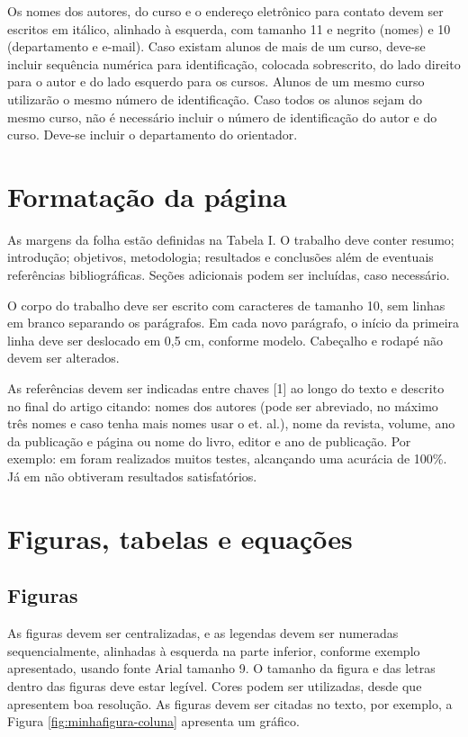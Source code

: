 \documentclass[a4paper,10pt, twocolumn]{article}
\begin{document}
 Os nomes dos autores, do curso e o endereço eletrônico para contato devem ser escritos em itálico, alinhado à esquerda, com tamanho 11 e negrito (nomes) e 10 (departamento e e-mail). Caso existam alunos de mais de um curso, deve-se incluir sequência numérica para identificação, colocada sobrescrito, do lado direito para o autor e do lado esquerdo para os cursos. Alunos de um mesmo curso utilizarão o mesmo número de identificação. Caso todos os alunos sejam do mesmo curso, não é necessário incluir o número de identificação do autor e do curso. Deve-se incluir o departamento do orientador.

\section{Formatação da página}
As margens da folha estão definidas na Tabela I. O trabalho deve conter resumo; introdução; objetivos, metodologia; resultados e conclusões além de eventuais referências bibliográficas. Seções adicionais podem ser incluídas, caso necessário. 

O corpo do trabalho deve ser escrito com caracteres de tamanho 10, sem linhas em branco separando os parágrafos. Em cada novo parágrafo, o início da primeira linha deve ser deslocado em 0,5 cm, conforme modelo. Cabeçalho e rodapé não devem ser alterados.

As referências devem ser indicadas entre chaves [1] ao longo do texto e descrito no final do artigo citando: nomes dos autores (pode ser abreviado, no máximo três nomes e caso tenha mais nomes usar o et. al.), nome da revista, volume, ano da publicação e página ou nome do livro, editor e ano de publicação. 
Por exemplo: em \cite{10.1145/3716895.3716981} foram realizados muitos testes, alcançando uma acurácia de 100\%. Já em \cite{10.1145/3593239} não obtiveram resultados satisfatórios.

\section{Figuras, tabelas e equações}

\subsection{Figuras}
As figuras devem ser centralizadas, e as legendas devem ser numeradas sequencialmente, alinhadas à esquerda na parte inferior, conforme exemplo apresentado, usando fonte Arial tamanho 9. O tamanho da figura e das letras dentro das figuras deve estar legível. Cores podem ser utilizadas, desde que apresentem boa resolução. As figuras devem ser citadas no texto, por exemplo, a Figura \ref{fig:minhafigura-coluna} apresenta um gráfico.
 
\end{document}
